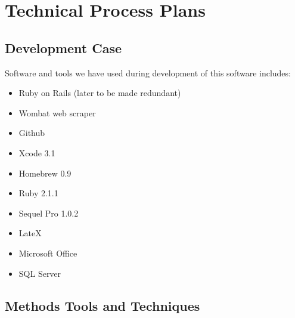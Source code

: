 
\chapter{Technical Process Plans} %

\label{Part6Chapter5} %



\section{Development Case}

Software and tools we have used during development of this software includes:
\begin{itemize}
	\item Ruby on Rails (later to be made redundant)
	\item Wombat web scraper
	\item Github
	\item Xcode 3.1
	\item Homebrew 0.9
	\item Ruby 2.1.1
	\item Sequel Pro 1.0.2
	\item LateX
	\item Microsoft Office
	\item SQL Server
\end{itemize}



\section{Methods Tools and Techniques}

